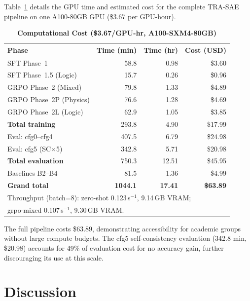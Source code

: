 \documentclass{ieeeaccess}
\newcommand{\modelname}{\textsc{TRA-SAE}}
\begin{document}
Table~\ref{tab:compute} details the GPU time and estimated cost for the
complete \modelname{} pipeline on one A100-80GB GPU
(\$3.67 per GPU-hour).

\begin{table}[t]
\caption{\textbf{Computational Cost (\$3.67/GPU-hr, A100-SXM4-80GB)}}
\label{tab:compute}
\centering
\setlength{\tabcolsep}{4pt}
\begin{tabular}{lrrr}
\toprule
\textbf{Phase}
  & \textbf{Time (min)}
  & \textbf{Time (hr)}
  & \textbf{Cost (USD)} \\
\midrule
SFT Phase~1                  &  58.8 & 0.98 & \$3.60 \\
SFT Phase~1.5 (Logic)        &  15.7 & 0.26 & \$0.96 \\
GRPO Phase~2 (Mixed)         &  79.8 & 1.33 & \$4.89 \\
GRPO Phase~2P (Physics)      &  76.6 & 1.28 & \$4.69 \\
GRPO Phase~2L (Logic)        &  62.9 & 1.05 & \$3.85 \\
\textbf{Total training}      & 293.8 & 4.90 & \$17.99 \\
\midrule
Eval: cfg0--cfg4             & 407.5 & 6.79 & \$24.98 \\
Eval: cfg5 (SC$\times$5)     & 342.8 & 5.71 & \$20.98 \\
\textbf{Total evaluation}    & 750.3 & 12.51 & \$45.95 \\
\midrule
Baselines B2--B4             &  81.5 & 1.36 & \$4.99 \\
\midrule
\textbf{Grand total}         & \textbf{1044.1} & \textbf{17.41} & \textbf{\$63.89} \\
\bottomrule
\multicolumn{4}{l}{\footnotesize Throughput (batch=8): zero-shot 0.123\,s$^{-1}$,
  9.14\,GB VRAM;} \\
\multicolumn{4}{l}{\footnotesize grpo-mixed 0.107\,s$^{-1}$, 9.30\,GB VRAM.}
\end{tabular}
\end{table}

The full pipeline costs \$63.89, demonstrating accessibility for
academic groups without large compute budgets.
The cfg5 self-consistency evaluation (342.8 min, \$20.98) accounts for
49\% of evaluation cost for no accuracy gain, further discouraging its
use at this scale.

\section{Discussion}
\label{sec:discussion}
\end{document}
